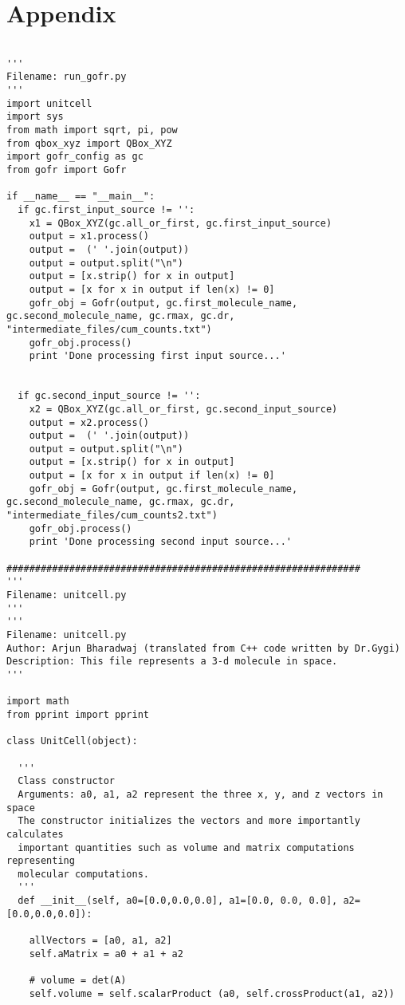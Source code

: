 \section*{Appendix}

\begin{verbatim}

'''
Filename: run_gofr.py
'''
import unitcell
import sys
from math import sqrt, pi, pow
from qbox_xyz import QBox_XYZ
import gofr_config as gc
from gofr import Gofr

if __name__ == "__main__":
  if gc.first_input_source != '':
    x1 = QBox_XYZ(gc.all_or_first, gc.first_input_source)
    output = x1.process()
    output =  (' '.join(output))
    output = output.split("\n")
    output = [x.strip() for x in output]
    output = [x for x in output if len(x) != 0]
    gofr_obj = Gofr(output, gc.first_molecule_name, gc.second_molecule_name, gc.rmax, gc.dr, "intermediate_files/cum_counts.txt")
    gofr_obj.process()
    print 'Done processing first input source...'
  
  
  if gc.second_input_source != '':
    x2 = QBox_XYZ(gc.all_or_first, gc.second_input_source)
    output = x2.process()
    output =  (' '.join(output))
    output = output.split("\n")
    output = [x.strip() for x in output]
    output = [x for x in output if len(x) != 0]
    gofr_obj = Gofr(output, gc.first_molecule_name, gc.second_molecule_name, gc.rmax, gc.dr, "intermediate_files/cum_counts2.txt")
    gofr_obj.process()
    print 'Done processing second input source...'

##############################################################
'''
Filename: unitcell.py
'''
'''
Filename: unitcell.py
Author: Arjun Bharadwaj (translated from C++ code written by Dr.Gygi)
Description: This file represents a 3-d molecule in space.
'''

import math
from pprint import pprint

class UnitCell(object):

  '''
  Class constructor
  Arguments: a0, a1, a2 represent the three x, y, and z vectors in space
  The constructor initializes the vectors and more importantly calculates 
  important quantities such as volume and matrix computations representing
  molecular computations.
  ''' 
  def __init__(self, a0=[0.0,0.0,0.0], a1=[0.0, 0.0, 0.0], a2=[0.0,0.0,0.0]):
    
    allVectors = [a0, a1, a2]
    self.aMatrix = a0 + a1 + a2
    
    # volume = det(A)
    self.volume = self.scalarProduct (a0, self.crossProduct(a1, a2))
    

\end{verbatim}

